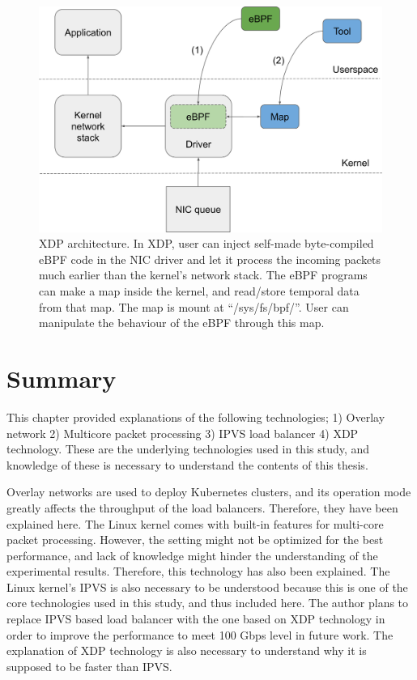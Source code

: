 \begin{figure}[h]
  \centering
  \includegraphics[width=0.95\columnwidth]{Figs/xdp-schem}

  \par\bigskip
  \centering
  \begin{minipage}{0.9\columnwidth}
    \caption[XDP architecture]{
      XDP architecture.
      In XDP, user can inject self-made byte-compiled eBPF code in the NIC driver and let it process the incoming packets much earlier than the kernel's network stack.
      The eBPF programs can make a map inside the kernel, and read/store temporal data from that map.
      The map is mount at \enquote{/sys/fs/bpf/}.
      User can manipulate the behaviour of the eBPF through this map.
    }
    \label{fig:xdp-schem}
  \end{minipage}
\end{figure}

\FloatBarrier

\section{Summary}

This chapter provided explanations of the following technologies; 1) Overlay network 2) Multicore packet processing 3) IPVS load balancer 4) XDP technology.
These are the underlying technologies used in this study, and knowledge of these is necessary to understand the contents of this thesis.

Overlay networks are used to deploy Kubernetes clusters, and its operation mode greatly affects the throughput of the load balancers.
Therefore, they have been explained here.
The Linux kernel comes with built-in features for multi-core packet processing.
However, the setting might not be optimized for the best performance, and lack of knowledge might hinder the understanding of the experimental results.
Therefore, this technology has also been explained.
The Linux kernel's IPVS is also necessary to be understood because this is one of the core technologies used in this study, and thus included here.
The author plans to replace IPVS based load balancer with the one based on XDP technology in order to improve the performance to meet 100 Gbps level in future work.
The explanation of XDP technology is also necessary to understand why it is supposed to be faster than IPVS.

